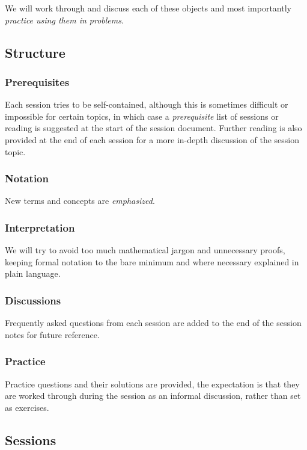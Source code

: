 \documentclass[11pt,a4paper]{article}
\begin{document}
We will work through and discuss each of these objects 
and most importantly \emph{practice using them in problems}. 

\subsection{Structure}

\subsubsection{Prerequisites}

Each session tries to be self-contained, 
although this is sometimes difficult or impossible for certain topics, 
in which case a \emph{prerequisite} list of sessions or reading is suggested at the start of the session document. 
Further reading is also provided at the end of each session for a more in-depth discussion 
of the session topic.

\subsubsection{Notation}

New terms and concepts are \emph{emphasized}. 

\subsubsection{Interpretation}

We will try to avoid too much mathematical jargon and unnecessary proofs, 
keeping formal notation to the bare minimum and where necessary 
explained in plain language.

\subsubsection{Discussions}

Frequently asked questions from each session 
are added to the end of the session notes for future reference.

\subsubsection{Practice}

Practice questions and their solutions are provided, 
the expectation is that they are worked through during the session as an informal discussion, 
rather than set as exercises.

\subsection{Sessions}
\end{document}
